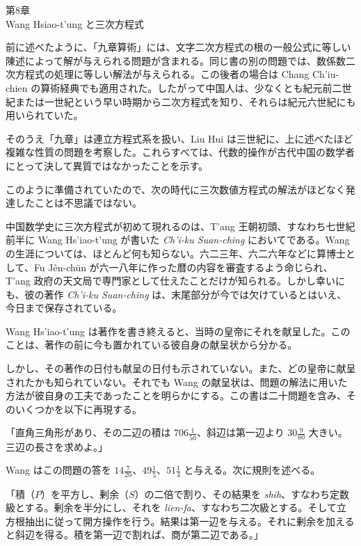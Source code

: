 \documentclass[11pt]{article}
\newcommand{\scanpage}[2]{\clearpage\setcounter{footnote}{0}\noindent{\footnotesize\color{gray}PDF #1 頁 · #2}\par\medskip}
\newcommand{\scanfooter}{}
\begin{document}
\begin{center}
第8章\\
Wang Hsiao-t'ung と三次方程式
\end{center}

前に述べたように、「九章算術」には、文字二次方程式の根の一般公式に等しい陳述によって解が与えられる問題が含まれる。同じ書の別の問題では、数係数二次方程式の処理に等しい解法が与えられる。この後者の場合は Chang Ch'iu-chien の算術経典でも適用された。したがって中国人は、少なくとも紀元前二世紀または一世紀という早い時期から二次方程式を知り、それらは紀元六世紀にも用いられていた。

そのうえ「九章」は連立方程式系を扱い、Liu Hui は三世紀に、上に述べたほど複雑な性質の問題を考察した。これらすべては、代数的操作が古代中国の数学者にとって決して異質ではなかったことを示す。

このように準備されていたので、次の時代に三次数値方程式の解法がほどなく発達したことは不思議ではない。

中国数学史に三次方程式が初めて現れるのは、T'ang 王朝初頭、すなわち七世紀前半に Wang Hs'iao-t'ung が書いた \emph{Ch'i-ku Suan-ching} においてである。Wang の生涯については、ほとんど何も知らない。六二三年、六二六年などに算博士として、Fu Jên-chün が六一八年に作った暦の内容を審査するよう命じられ、T'ang 政府の天文局で専門家として仕えたことだけが知られる。しかし幸いにも、彼の著作 \emph{Ch'i-ku Suan-ching} は、末尾部分が今では欠けているとはいえ、今日まで保存されている。

Wang Hs'iao-t'ung は著作を書き終えると、当時の皇帝にそれを献呈した。このことは、著作の前に今も置かれている彼自身の献呈状から分かる。
\scanfooter

\scanpage{0068}{第8章、印刷頁54}
しかし、その著作の日付も献呈の日付も示されていない。また、どの皇帝に献呈されたかも知られていない。それでも Wang の献呈状は、問題の解法に用いた方法が彼自身の工夫であったことを明らかにする。この書は二十問題を含み、そのいくつかを以下に再現する。

「直角三角形があり、その二辺の積は $706\frac{1}{50}$、斜辺は第一辺より $30\frac{9}{60}$ 大きい。三辺の長さを求めよ。」

Wang はこの問題の答を $14\frac{7}{20}$、$49\frac{1}{5}$、$51\frac{1}{4}$ と与える。次に規則を述べる。

「積（$P$）を平方し、剰余（$S$）の二倍で割り、その結果を \emph{shih}、すなわち定数級とする。剰余を半分にし、それを \emph{lien-fa}、すなわち二次級とする。そして立方根抽出に従って開方操作を行う。結果は第一辺を与える。それに剰余を加えると斜辺を得る。積を第一辺で割れば、商が第二辺である。」
\end{document}
